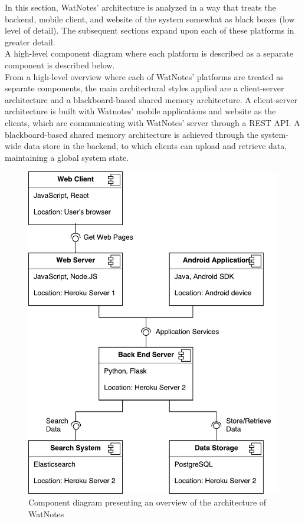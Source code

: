 \documentclass[12pt]{article}
\begin{document}
    In this section, WatNotes' architecture is analyzed in a way that treats the backend, mobile client, and website of the system
    somewhat as black boxes (low level of detail). The subsequent sections expand upon each of these platforms in greater detail. \\

    A high-level component diagram where each platform is described as a separate component is described below. \\

    From a high-level overview where each of WatNotes' platforms are treated as separate components, the main architectural styles applied are
    a client-server architecture and a blackboard-based shared memory architecture. A client-server architecture is built with Watnotes' mobile
    applications and website as the clients, which are communicating with WatNotes' server through a REST API. A blackboard-based shared memory
    architecture is achieved through the system-wide data store in the backend, to which clients can upload and retrieve data, maintaining a
    global system state. \\

    \begin{figure}[H]
      \includegraphics[width=\textwidth]{assets/overview.pdf}
      \caption{Component diagram presenting an overview of the architecture of WatNotes}
    \end{figure}
\end{document}
